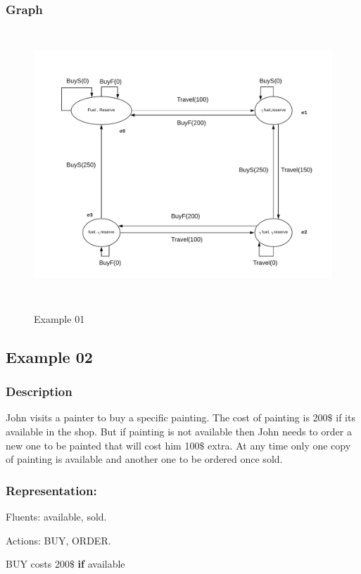 \documentclass[11pt]{article}
\begin{document}
	\subsubsection{Graph}\label{par:p401}
	\begin{figure}[H]
		\centering
		\includegraphics[width=5in,height=4in]{./media/ex01.png}
		\label{Figure:f01}
		\caption{Example 01}
	\end{figure}
	\subsection{Example 02}\label{example:ex02}
	\subsubsection{Description}\label{par:p102}
	John visits a painter to buy a specific painting. The cost of painting is 200$\$$  if its available in the shop. But if painting is not available then John needs to order a new one to be painted that will cost him 100$\$$  extra. At any time only one copy of painting is available and another one to be ordered once sold.
	
	\subsubsection{Representation:}\label{par:p202}
	\indent 
	\par Fluents: available, sold.\par
	Actions: BUY, ORDER.\par
	BUY costs 200$\$$  \textbf{if} available\par
	
\end{document}
